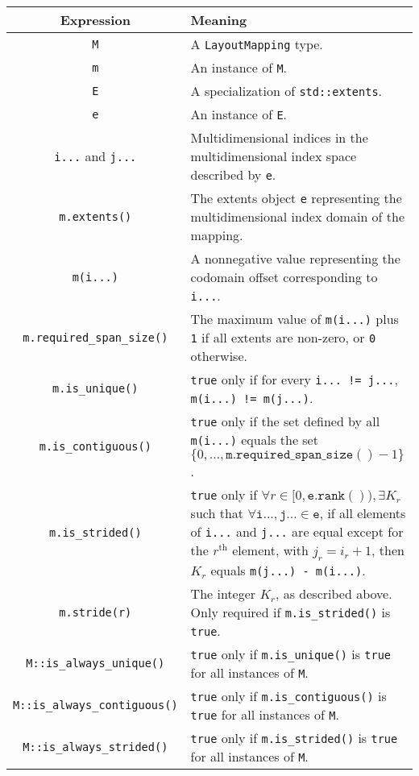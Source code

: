 \begin{tabular}{|c|p{15em}|}
\hline
Expression & Meaning \\
\hline
    \texttt{M} & A \texttt{LayoutMapping} type. \\
    \texttt{m} & An instance of \texttt{M}. \\
    \texttt{E} & A specialization of \texttt{std::extents}. \\
    \texttt{e} & An instance of \texttt{E}. \\
    \texttt{i...} and \texttt{j...} & Multidimensional indices in the multidimensional index space described by \texttt{e}. \\
    \texttt{m.extents()} & The extents object \texttt{e} representing the multidimensional index domain of the mapping.  \\
    \texttt{m(i...)} & A nonnegative value representing the codomain offset corresponding to \texttt{i...}. \\
    \texttt{m.required\_span\_size()} & The maximum value of \texttt{m(i...)} plus \texttt{1} if all extents are non-zero, or \texttt{0} otherwise. \\
    \texttt{m.is\_unique()} & \texttt{true} only if for every \texttt{i... != j...}, \texttt{m(i...) != m(j...)}. \\
    \texttt{m.is\_contiguous()} & \texttt{true} only if the set defined by all \texttt{m(i...)} equals the set $\{0, ..., \mathtt{m.required\_span\_size()} - 1\}$. \\
    \texttt{m.is\_strided()} & \texttt{true} only if $\forall r \in [0, \mathtt{e.rank()}), \exists K_r$ such that $\forall \mathtt{i...}, \mathtt{j...} \in \mathtt{e}$, if all elements of \texttt{i...} and \texttt{j...} are equal except for the $r^{\mathrm{th}}$ element, with $j_r = i_r + 1$, then $K_r$ equals \texttt{m(j...) - m(i...)}. \\
    \texttt{m.stride(r)} & The integer $K_r$, as described above.  Only required if \texttt{m.is\_strided()} is \texttt{true}. \\
    \texttt{M::is\_always\_unique()} & \texttt{true} only if \texttt{m.is\_unique()} is \texttt{true} for all instances of \texttt{M}. \\
    \texttt{M::is\_always\_contiguous()} & \texttt{true} only if \texttt{m.is\_contiguous()} is \texttt{true} for all instances of \texttt{M}. \\
    \texttt{M::is\_always\_strided()} & \texttt{true} only if \texttt{m.is\_strided()} is \texttt{true} for all instances of \texttt{M}. \\
\hline
\end{tabular}
